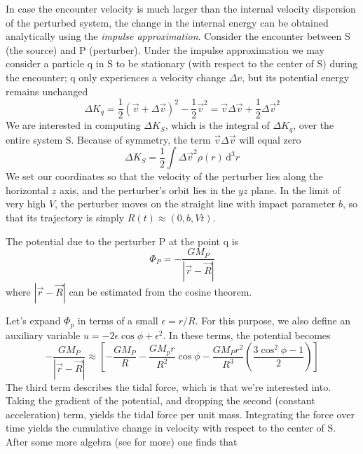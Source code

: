 In case the encounter velocity is much larger than the internal velocity dispersion of the perturbed system, the change in the internal energy can be obtained analytically using the \emph{impulse approximation}. Consider the encounter between S (the source) and P (perturber). Under the impulse approximation we may consider a particle q in S to be stationary (with respect to the center of S) during the encounter; q only experiences a velocity change $\Delta v$, but its potential energy remains unchanged
\begin{equation*}
    \Delta K_{q} = \frac{1}{2}(\vec{v}+\Delta \vec{v})^{2} - \frac{1}{2}\vec{v}^{2} = \vec{v}\Delta\vec{v} + \frac{1}{2}\Delta\vec{v}^{2}
\end{equation*}
We are interested in computing $\Delta K_{S}$, which is the integral of $\Delta K_{q}$, over the entire system S. Because of symmetry, the term $\vec{v}\Delta\vec{v}$ will equal zero
\begin{equation*}
    \Delta K_{S} = \frac{1}{2}\int \Delta\vec{v}^{2}\rho(r)\,\text{d}^{3}r
\end{equation*}
We set our coordinates so that the velocity of the perturber lies along the horizontal $z$ axis, and the perturber’s orbit lies in the $yz$ plane. In the limit of very high $V$, the perturber moves on the straight line with impact parameter $b$, so that its trajectory is simply $R(t)\approx (0, b, Vt)$.
\par The potential due to the perturber P at the point q is
\begin{equation*}
    \Phi_{P}  = -\frac{GM_{P}}{|\vec{r}-\vec{R}|}
\end{equation*}
where $|\vec{r}-\vec{R}|$ can be estimated from the cosine theorem.
\par Let's expand $\Phi_{p}$ in terms of a small $\epsilon = r/R$. For this purpose, we also define an auxiliary variable $u = -2\epsilon\cos\phi +\epsilon^{2}$. In these terms, the potential becomes
\begin{equation*}
    -\frac{GM_{P}}{|\vec{r}-\vec{R}|} \approx \left[ -\frac{GM_{P}}{R}-\frac{GM_{p}r}{R^{2}}\cos\phi-\frac{GM_{P}r^{2}}{R^{3}}\left(\frac{3\cos^{2}\phi -1}{2}\right)\right]
\end{equation*}
The third term describes the tidal force, which is that we're interested into. Taking the gradient of the potential, and dropping the second (constant acceleration) term, yields the tidal force per unit mass. Integrating the force over time yields the cumulative change in velocity with respect to the center of S. After some more algebra (see \cite{2009PhT....62e..56B} for more) one finds that
